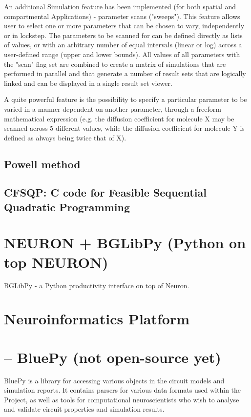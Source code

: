 An additional Simulation feature has been implemented (for both spatial and
compartmental Applications) - parameter scans ("sweeps").
This feature allows user to select one or more parameters that can be chosen to
vary, independently or in lockstep.
The parameters to be scanned for can be defined directly as lists of values, or
with an arbitrary number of equal intervals (linear or log) across a
user-defined range (upper and lower bounds). All values of all parameters with
the "scan" flag set are combined to create a matrix of simulations that are
performed in parallel and that generate a number of result sets that are
logically linked and can be displayed in a single result set viewer.

A quite powerful feature is the possibility to specify a particular parameter to
be varied in a manner dependent on another parameter, through a freeform
mathematical expression (e.g. the diffusion coefficient for molecule X may be
scanned across 5 different values, while the diffusion coefficient for molecule
Y is defined as always being twice that of X).


\subsection{Powell method}
\label{sec:Powell-method}


\subsection{CFSQP: C code for Feasible Sequential Quadratic Programming}
\label{sec:CFSQP}



\section{NEURON + BGLibPy (Python on top NEURON)}
\label{sec:bglibpy}

BGLibPy - a Python productivity interface on top of Neuron.

\section{Neuroinformatics  Platform}


\section{-- BluePy (not open-source yet)}

BluePy is a library for accessing various objects in the circuit models and
simulation reports. It contains parsers for various data formats used within the
Project, as well as tools for computational neuroscientists who wish to analyse
and validate circuit properties and simulation results.

